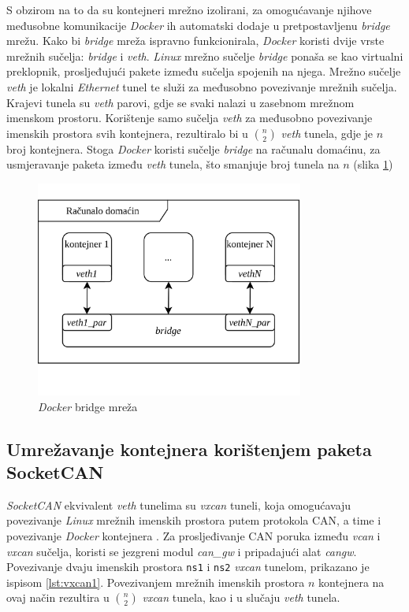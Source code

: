 \documentclass[times, utf8, diplomski, numeric]{fer}
\begin{document}
S obzirom na to da su kontejneri mrežno izolirani, za omogućavanje njihove međusobne komunikacije \textit{Docker} ih automatski dodaje u pretpostavljenu \textit{bridge} mrežu. Kako bi \textit{bridge} mreža ispravno funkcionirala, \textit{Docker} koristi dvije vrste mrežnih sučelja: \textit{bridge} i \textit{veth}. \textit{Linux} mrežno sučelje \textit{bridge} ponaša se kao virtualni preklopnik, prosljeđujući pakete između sučelja spojenih na njega. Mrežno sučelje \textit{veth} je lokalni \textit{Ethernet} tunel te služi za međusobno povezivanje mrežnih sučelja. Krajevi tunela su \textit{veth} parovi, gdje se svaki nalazi u zasebnom mrežnom imenskom prostoru. Korištenje samo sučelja \textit{veth} za međusobno povezivanje imenskih prostora svih kontejnera, rezultiralo bi u $\binom{n}{2}$ \textit{veth} tunela, gdje je $n$ broj kontejnera. Stoga \textit{Docker} koristi sučelje \textit{bridge} na računalu domaćinu, za usmjeravanje paketa između \textit{veth} tunela, što smanjuje broj tunela na $n$ (slika \ref{fig:bridge})
\begin{figure}[htb]
\centering
\includegraphics[width=250pt]{bridge.png}
\caption{\textit{Docker} bridge mreža}
\label{fig:bridge}
\end{figure}
\newpage
\subsection{Umrežavanje kontejnera korištenjem paketa SocketCAN} \label{sec:dockercan2}

\textit{SocketCAN} ekvivalent \textit{veth} tunelima su \textit{vxcan} tuneli, koja omogućavaju povezivanje \textit{Linux} mrežnih imenskih prostora putem protokola CAN, a time i povezivanje \textit{Docker} kontejnera \cite{liu2018interfaces}. Za prosljeđivanje CAN poruka između \textit{vcan} i \textit{vxcan} sučelja, koristi se jezgreni modul \textit{can\_gw} i pripadajući alat \textit{cangw}. Povezivanje dvaju imenskih prostora \texttt{ns1} i \texttt{ns2} \textit{vxcan} tunelom, prikazano je ispisom \ref{lst:vxcan1}. Povezivanjem mrežnih imenskih prostora $n$ kontejnera na ovaj način rezultira u $\binom{n}{2}$ \textit{vxcan} tunela, kao i u slučaju \textit{veth} tunela. 
\end{document}
